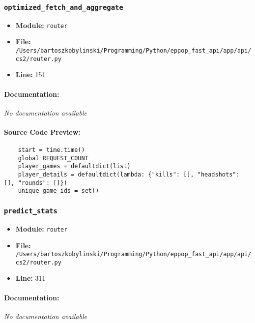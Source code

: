 \documentclass[11pt,a4paper]{article}
\begin{document}
\vspace{1em}
\subsubsection{\texttt{optimized\_fetch\_and\_aggregate}}

\begin{itemize}
    \item \textbf{Module:} \texttt{router}
    \item \textbf{File:} \texttt{/Users/bartoszkobylinski/Programming/Python/eppop\_fast\_api/app/api/cs2/router.py}
    \item \textbf{Line:} 151
\end{itemize}

\paragraph{Documentation:} \textit{No documentation available}

\paragraph{Source Code Preview:}
\begin{verbatim}
    start = time.time()
    global REQUEST_COUNT
    player_games = defaultdict(list)
    player_details = defaultdict(lambda: {"kills": [], "headshots": [], "rounds": []})
    unique_game_ids = set()
\end{verbatim}

\vspace{1em}
\subsubsection{\texttt{predict\_stats}}

\begin{itemize}
    \item \textbf{Module:} \texttt{router}
    \item \textbf{File:} \texttt{/Users/bartoszkobylinski/Programming/Python/eppop\_fast\_api/app/api/cs2/router.py}
    \item \textbf{Line:} 311
\end{itemize}

\paragraph{Documentation:} \textit{No documentation available}
\end{document}
